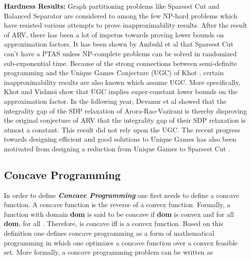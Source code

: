\documentclass [11pt,a4paper]{article}
\begin{document}
\textbf{Hardness Results:} Graph partitioning problems like {\sc Sparsest Cut} and {\sc Balanced Separator}
are considered to among the few NP-hard problems which have resisted various attempts to prove inapproximability 
results. After the result of {\sf ARV}, there has been 
a lot of impetus towards proving lower bounds on approximation factors. It has been 
shown by Ambuhl et al \cite{AMS07} that {\sc Sparsest Cut} can't have a PTAS unless NP-complete problems
can be solved in randomized sub-exponential time. Because of the strong connections 
between semi-definite programming and the {\sc Unique Games Conjecture (UGC)} of Khot \cite{Kh02}, certain inapproximability
results are also known which assume UGC. More specifically, Khot and Vishnoi \cite{KV05} show that 
UGC implies super-constant lower bounds on the approximation factor. In the following year,
Devanur et al \cite{DKSV06} showed that the integrality gap of the SDP relaxation of Arora-Rao-Vazirani is 
 thereby disproving the original conjecture of ARV that 
the integrality gap of their SDP relaxation is atmost a constant. This result did not rely upon the {\sc UGC}. 
The recent progress towards designing efficient and good solutions to {\sc Unique Games}
has also been motivated from designing a reduction from {\sc Unique Games} to {\sc Sparsest Cut} \cite{AKK*08}. 

\subsection{Concave Programming}
In order to define \emph{\textbf{Concave Programming}} one first needs to define a concave
function. A concave function is the reverse of a convex function. 
Formally, a function  with domain \textbf{dom} is said to be concave if 
\textbf{dom} is convex and for all  \textbf{dom},  for all . Therefore,  is concave iff  is a convex function. 
Based on this definition one defines concave programming as a form of mathematical programming 
in which one optimizes a concave function over a convex feasible set. 
More formally, a concave programming problem can be written as
\end{document}
